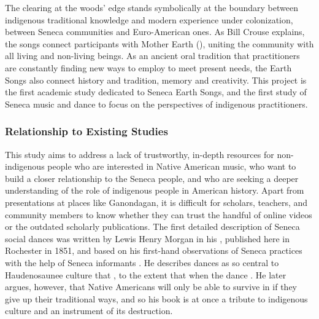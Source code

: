 \documentclass{neh}
\begin{document}
The clearing at the woods' edge stands symbolically at the boundary between
indigenous traditional knowledge and modern experience under colonization,
between Seneca communities and Euro-American ones.
As Bill Crouse explains, the songs connect participants with Mother Earth
(), uniting the community with all living and
non-living beings.
As an ancient oral tradition that practitioners are constantly finding new
ways to employ to meet present needs, the Earth Songs also connect history and
tradition, memory and creativity.
This project is the first academic study dedicated to Seneca Earth Songs, and
the first study of Seneca music and dance to focus on the perspectives of
indigenous practitioners.

\subsubsection{Relationship to Existing Studies}

This study aims to address a lack of trustworthy, in-depth resources for
non-indigenous people who are interested in Native American music, who want to
build a closer relationship to the Seneca people, and who are seeking a deeper
understanding of the role of indigenous people in American history.
Apart from presentations at places like Ganondagan, it is difficult for
scholars, teachers, and community members to know whether they can trust the
handful of online videos or the outdated scholarly publications.
The first detailed description of Seneca social dances was written by Lewis
Henry Morgan in his ,
published here in Rochester in 1851, and based on his first-hand observations
of Seneca practices with the help of Seneca informants
\Autocite{Morgan:League}.
He describes dances as so central to Haudenosaunee culture that , to the
extent that when the dance 
\Autocite[261, 263]{Morgan:League}.
He later argues, however, that Native Americans will only be able to survive
in  if they give up their traditional ways, and so his
book is at once a tribute to indigenous culture and an instrument of its
destruction.
\end{document}
